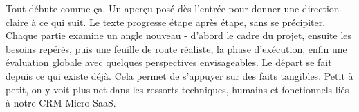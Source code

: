 \vspace{0.5cm}

Tout débute comme ça. Un aperçu posé dès l'entrée pour donner une direction claire à ce qui suit. Le texte progresse étape après étape, sans se précipiter. Chaque partie examine un angle nouveau - d’abord le cadre du projet, ensuite les besoins repérés, puis une feuille de route réaliste, la phase d’exécution, enfin une évaluation globale avec quelques perspectives envisageables. Le départ se fait depuis ce qui existe déjà. Cela permet de s’appuyer sur des faits tangibles. Petit à petit, on y voit plus net dans les ressorts techniques, humains et fonctionnels liés à notre CRM Micro-SaaS.